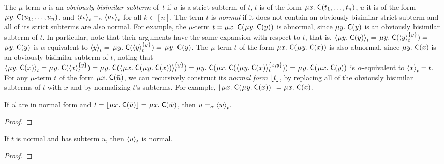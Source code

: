 The $\mu$-term $u$
is an \emph{obviously bisimilar subterm} of~$t$ if
$u$ is a strict subterm of $t$,
$t$ is of the form $\MU x.\; \const{C}( t_1, \ldots, t_n )$,
$u$ it is of the form $\MU y.\; \const{C}( u_1, \ldots, u_n )$,
and $\interp{t}{ t_k } \aequiv \interp{t}{ u_k }$ for all $k \in [n]$.
The term $t$ is \emph{normal} if it does not contain an obviously bisimilar strict subterm
and all of its strict subterms are also normal.
For example, the $\mu$-term $t = \MU x.\; \const{C}( \MU y.\; \const{C}( y ) )$ is abnormal,
since $\MU y.\; \const{C}( y )$ is an obviously bisimilar subterm of $t$.
In particular, note that their arguments have the same expansion with respect to $t$,
that is,
$\interp{t}{\MU y.\; \const{C}( y )} =$
$\MU y.\; \const{C}( \interp{t}{y}^{\{y\}} ) =$
$\MU y.\; \const{C}( y )$
is $\alpha$-equivalent to
$\interp{t}{y} =$
$\MU y.\; \const{C}( \interp{t}{y}^{\{y\}} ) =$
$\MU y.\; \const{C}( y )$.
The $\mu$-term $t$ of the form $\MU x.\; \const{C}( \MU y.\; \const{C}( x ) )$ is also abnormal,
since $\MU y.\; \const{C}( x )$ is an obviously bisimilar subterm of $t$,
noting that
$\interp{t}{\MU y.\; \const{C}( x )} =
\MU y.\; \const{C}( \interp{t}{x}^{\{y\}} ) =
\MU y.\; \const{C}( \interp{t}{\MU x.\; \const{C}( \MU y.\; \const{C}( x ) ) }^{\{y\}} ) =
\MU y.\; \const{C}( \MU x.\; \const{C}( \interp{t}{\MU y.\; \const{C}( x )}^{\{x,y\}} ) ) =
\MU y.\allowbreak\; \const{C}( \MU x.\; \const{C}( y ) )$
is $\alpha$-equivalent to $\interp{t}{x} = t$.
For any $\mu$-term $t$ of the form $\MU x.\; \const C( \vec u )$, we can
recursively construct its \emph{normal form} $\nf{t}$,
by replacing all of the obviously bisimilar subterms of $t$ with $x$
and by normalizing $t$'s subterms.
For example, $\nf{\MU x.\; \const{C}( \MU y.\; \const{C}( x ) )} = \MU x.\; \const{C}( x )$.

\begin{report}
\begin{lemma}
\label{lem:mu-norm-arg}
If $\vec u$ are in normal form and $t = \nf{\MU x.\; \const{C}( \vec u )} = \MU x.\; \const{C}( \vec w )$,
then $\vec u \vsim \interp{t}{\vec w}$.
\end{lemma}
\begin{proof}
\end{proof}

\begin{lemma}
\label{lem:mu-norm-interp}
If $t$ is normal and has subterm $u$, then $\interp{t}{u}$ is normal.
\end{lemma}
\begin{proof}
\end{proof}

\end{report}

